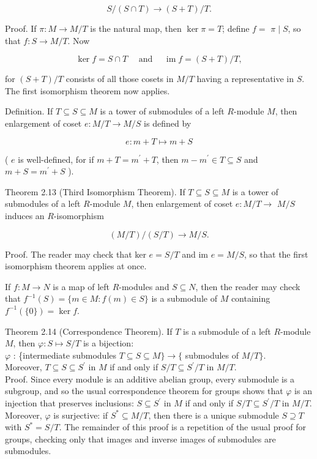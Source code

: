 \documentclass[10pt]{article}
\begin{document}
$$
S /(S \cap T) \rightarrow(S+T) / T .
$$

Proof. If $\pi: M \rightarrow M / T$ is the natural map, then $\operatorname{ker} \pi=T$; define $f=$ $\pi \mid S$, so that $f: S \rightarrow M / T$. Now

$$
\operatorname{ker} f=S \cap T \quad \text { and } \quad \operatorname{im} f=(S+T) / T,
$$

for $(S+T) / T$ consists of all those cosets in $M / T$ having a representative in $S$. The first isomorphism theorem now applies.

Definition. If $T \subseteq S \subseteq M$ is a tower of submodules of a left $R$-module $M$, then enlargement of coset $e: M / T \rightarrow M / S$ is defined by

$$
e: m+T \mapsto m+S
$$

( $e$ is well-defined, for if $m+T=m^{\prime}+T$, then $m-m^{\prime} \in T \subseteq S$ and $m+S=m^{\prime}+S$ ).

Theorem 2.13 (Third Isomorphism Theorem). If $T \subseteq S \subseteq M$ is a tower of submodules of a left $R$-module $M$, then enlargement of coset $e: M / T \rightarrow$ $M / S$ induces an $R$-isomorphism

$$
(M / T) /(S / T) \rightarrow M / S .
$$

Proof. The reader may check that ker $e=S / T$ and im $e=M / S$, so that the first isomorphism theorem applies at once.

If $f: M \rightarrow N$ is a map of left $R$-modules and $S \subseteq N$, then the reader may check that $f^{-1}(S)=\{m \in M: f(m) \in S\}$ is a submodule of $M$ containing $f^{-1}(\{0\})=\operatorname{ker} f$.

Theorem 2.14 (Correspondence Theorem). If $T$ is a submodule of a left $R$-module $M$, then $\varphi: S \mapsto S / T$ is a bijection:\\
$\varphi$ : \{intermediate submodules $T \subseteq S \subseteq M\} \rightarrow\{$ submodules of $M / T\}$.\\
Moreover, $T \subseteq S \subseteq S^{\prime}$ in $M$ if and only if $S / T \subseteq S^{\prime} / T$ in $M / T$.\\
Proof. Since every module is an additive abelian group, every submodule is a subgroup, and so the usual correspondence theorem for groups shows that $\varphi$ is an injection that preserves inclusions: $S \subseteq S^{\prime}$ in $M$ if and only if $S / T \subseteq S^{\prime} / T$ in $M / T$. Moreover, $\varphi$ is surjective: if $S^{*} \subseteq M / T$, then there is a unique submodule $S \supseteq T$ with $S^{*}=S / T$. The remainder of this proof is a repetition of the usual proof for groups, checking only that images and inverse images of submodules are submodules.
\end{document}
